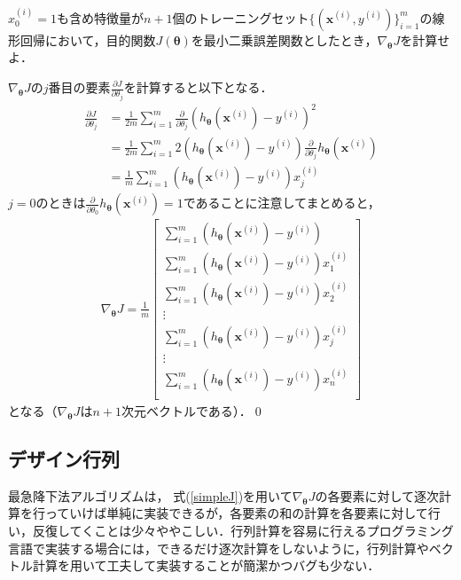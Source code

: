 \begin{qu}
$x_0^{(i)}=1$も含め特徴量が$n+1$個のトレーニングセット$\{({\bm x}^{(i)},y^{(i)})\}_{i=1}^m$の線形回帰において，目的関数$J({\bm \theta})$を最小二乗誤差関数としたとき，$\nabla_{{\bm \theta}}J$を計算せよ．
\end{qu}
\begin{ans}
$\nabla_{{\bm \theta}}J$の$j$番目の要素$\frac{\partial J}{\partial \theta_j}$を計算すると以下となる．
\begin{align*}
\frac{\partial J}{\partial \theta_j}&= \frac{1}{2m}\sum_{i=1}^m \frac{\partial }{\partial \theta_j}(h_{{\bm \theta}}({\bm x}^{(i)})-y^{(i)})^2 \\
&=\frac{1}{2m}\sum_{i=1}^m 2(h_{{\bm \theta}}({\bm x}^{(i)})-y^{(i)})\frac{\partial }{\partial \theta_j}h_{{\bm \theta}}({\bm x}^{(i)})\\
&= \frac{1}{m}\sum_{i=1}^m (h_{{\bm \theta}}({\bm x}^{(i)})-y^{(i)})x_j^{(i)}
\end{align*}
$j=0$のときは$\frac{\partial }{\partial \theta_0}h_{{\bm \theta}}({\bm x}^{(i)})=1$であることに注意してまとめると，
\begin{align}
\nabla_{{\bm \theta}}J =\frac{1}{m}
\begin{bmatrix}
\sum_{i=1}^m (h_{{\bm \theta}}({\bm x}^{(i)})-y^{(i)}) \\[3pt]
\sum_{i=1}^m (h_{{\bm \theta}}({\bm x}^{(i)})-y^{(i)})x_1^{(i)} \\[3pt]
\sum_{i=1}^m (h_{{\bm \theta}}({\bm x}^{(i)})-y^{(i)})x_2^{(i)} \\[3pt]
\vdots \\[3pt]
\sum_{i=1}^m (h_{{\bm \theta}}({\bm x}^{(i)})-y^{(i)})x_j^{(i)} \\[3pt]
\vdots \\[3pt]
\sum_{i=1}^m (h_{{\bm \theta}}({\bm x}^{(i)})-y^{(i)})x_n^{(i)} \\[3pt]
\end{bmatrix}\label{simpleJ}
\end{align}
となる（$\nabla_{{\bm \theta}}J$は$n+1$次元ベクトルである）．\qed
\end{ans}

\subsection{デザイン行列}

最急降下法アルゴリズムは， 式(\ref{simpleJ})を用いて$\nabla_{{\bm \theta}}J$の各要素に対して逐次計算を行っていけば単純に実装できるが，各要素の和の計算を各要素に対して行い，反復してくことは少々ややこしい．行列計算を容易に行えるプログラミング言語で実装する場合には，できるだけ逐次計算をしないように，行列計算やベクトル計算を用いて工夫して実装することが簡潔かつバグも少ない．


